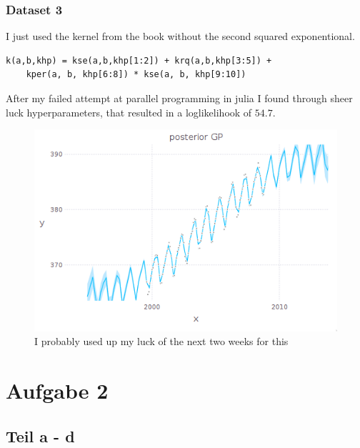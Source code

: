 \documentclass[10pt,a4paper]{article}
\begin{document}
\subsubsection{Dataset 3}

I just used the kernel from the book without the second squared exponentional.
\begin{verbatim}
k(a,b,khp) = kse(a,b,khp[1:2]) + krq(a,b,khp[3:5]) +
    kper(a, b, khp[6:8]) * kse(a, b, khp[9:10])
\end{verbatim}
After my failed attempt at parallel programming in julia I found through sheer
luck hyperparameters, that resulted in a loglikelihook of $54.7$.
\begin{figure}[h]
  \centering
  \includegraphics[width=350pt]{1_b_3}
  \caption{I probably used up my luck of the next two weeks for this}
\end{figure}

\section{Aufgabe 2}

\subsection{Teil a - d}
\end{document}

